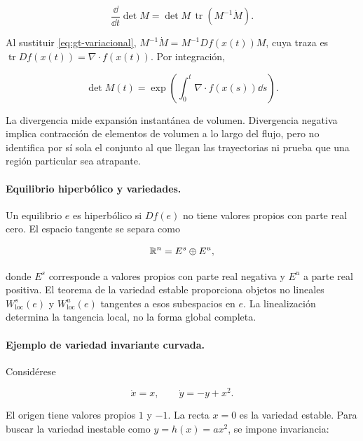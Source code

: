 \begin{equation}
 \frac{\dd}{\dd t}\det M
 =\det M\,\operatorname{tr}(M^{-1}\dot M).
 \label{eq:gt-jacobi-det}
\end{equation}

Al sustituir \eqref{eq:gt-variacional},
$M^{-1}\dot M=M^{-1}Df(x(t))M$, cuya traza es
$\operatorname{tr}Df(x(t))=\nabla\cdot f(x(t))$. Por integración,

\begin{equation}
 \det M(t)=
 \exp\left(\int_0^t\nabla\cdot f(x(s))\dd s\right).
 \label{eq:gt-liouville}
\end{equation}

La divergencia mide expansión instantánea de volumen. Divergencia negativa implica
contracción de elementos de volumen a lo largo del flujo, pero no identifica por sí
sola el conjunto al que llegan las trayectorias ni prueba que una región particular
sea atrapante.

\paragraph{Equilibrio hiperbólico y variedades.}
Un equilibrio $e$ es hiperbólico si $Df(e)$ no tiene valores propios con parte real
cero. El espacio tangente se separa como

\begin{equation}
 \mathbb{R}^n=E^s\oplus E^u,
 \label{eq:gt-descomposicion-hiperbolica}
\end{equation}

donde $E^s$ corresponde a valores propios con parte real negativa y $E^u$ a parte
real positiva. El teorema de la variedad estable proporciona objetos no lineales
$W^s_{\mathrm{loc}}(e)$ y $W^u_{\mathrm{loc}}(e)$ tangentes a esos subespacios en
$e$. La linealización determina la tangencia local, no la forma global completa.

\paragraph{Ejemplo de variedad invariante curvada.}
Considérese

\begin{equation}
 \dot x=x,\qquad \dot y=-y+x^2.
 \label{eq:gt-silla-no-lineal}
\end{equation}

El origen tiene valores propios $1$ y $-1$. La recta $x=0$ es la variedad estable.
Para buscar la variedad inestable como $y=h(x)=ax^2$, se impone invariancia:

